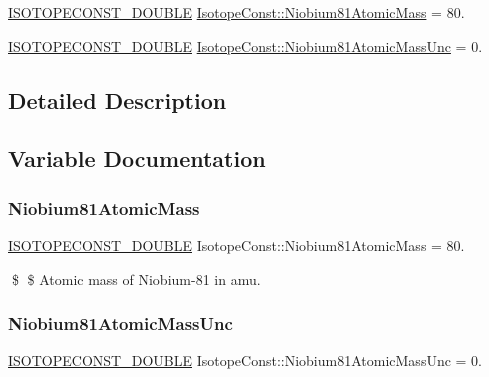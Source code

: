 \begin{DoxyCompactItemize}
\item 
\mbox{\hyperlink{group___isotope_const-_macros_ga8f45a7272ce02c0b4c65c44636ed719a}{I\+S\+O\+T\+O\+P\+E\+C\+O\+N\+S\+T\+\_\+\+D\+O\+U\+B\+LE}} \mbox{\hyperlink{group___isotope_const-_niobium-_nb81_ga59209efbfccc17f64033600283b4b003}{Isotope\+Const\+::\+Niobium81\+Atomic\+Mass}} = 80.
\item 
\mbox{\hyperlink{group___isotope_const-_macros_ga8f45a7272ce02c0b4c65c44636ed719a}{I\+S\+O\+T\+O\+P\+E\+C\+O\+N\+S\+T\+\_\+\+D\+O\+U\+B\+LE}} \mbox{\hyperlink{group___isotope_const-_niobium-_nb81_gab84f47af86e4e519b488c29cb9d4a5f4}{Isotope\+Const\+::\+Niobium81\+Atomic\+Mass\+Unc}} = 0.
\end{DoxyCompactItemize}


\subsection{Detailed Description}


\subsection{Variable Documentation}
\mbox{\label{group___isotope_const-_niobium-_nb81_ga59209efbfccc17f64033600283b4b003}} 
\subsubsection{\texorpdfstring{Niobium81\+Atomic\+Mass}{Niobium81AtomicMass}}
{\footnotesize\ttfamily \mbox{\hyperlink{group___isotope_const-_macros_ga8f45a7272ce02c0b4c65c44636ed719a}{I\+S\+O\+T\+O\+P\+E\+C\+O\+N\+S\+T\+\_\+\+D\+O\+U\+B\+LE}} Isotope\+Const\+::\+Niobium81\+Atomic\+Mass = 80.}

\$ \$ Atomic mass of Niobium-\/81 in amu. \mbox{\label{group___isotope_const-_niobium-_nb81_gab84f47af86e4e519b488c29cb9d4a5f4}} 
\subsubsection{\texorpdfstring{Niobium81\+Atomic\+Mass\+Unc}{Niobium81AtomicMassUnc}}
{\footnotesize\ttfamily \mbox{\hyperlink{group___isotope_const-_macros_ga8f45a7272ce02c0b4c65c44636ed719a}{I\+S\+O\+T\+O\+P\+E\+C\+O\+N\+S\+T\+\_\+\+D\+O\+U\+B\+LE}} Isotope\+Const\+::\+Niobium81\+Atomic\+Mass\+Unc = 0.}

